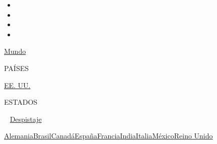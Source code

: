 \begin{itemize}
\item
\item
\item
\item
\end{itemize}

\href{https://www.nytimes3xbfgragh.onion/interactive/2020/world/coronavirus-maps.html}{Mundo}~

PAÍSES

\textbar{}
\href{https://www.nytimes3xbfgragh.onion/es/interactive/2020/espanol/mundo/coronavirus-en-estados-unidos.html}{EE.
UU.}~

ESTADOS

~
\href{https://www.nytimes3xbfgragh.onion/interactive/2020/us/coronavirus-testing.html}{Despistaje}

\href{https://www.nytimes3xbfgragh.onion/interactive/2020/world/europe/germany-coronavirus-cases.html}{Alemania}\href{https://www.nytimes3xbfgragh.onion/interactive/2020/world/americas/brazil-coronavirus-cases.html}{Brasil}\href{https://www.nytimes3xbfgragh.onion/interactive/2020/world/canada/canada-coronavirus-cases.html}{Canadá}\href{https://www.nytimes3xbfgragh.onion/interactive/2020/world/europe/spain-coronavirus-cases.html}{España}\href{https://www.nytimes3xbfgragh.onion/interactive/2020/world/europe/france-coronavirus-cases.html}{Francia}\href{https://www.nytimes3xbfgragh.onion/interactive/2020/world/asia/india-coronavirus-cases.html}{India}\href{https://www.nytimes3xbfgragh.onion/interactive/2020/world/europe/italy-coronavirus-cases.html}{Italia}\href{https://www.nytimes3xbfgragh.onion/es/interactive/2020/espanol/america-latina/coronavirus-en-mexico.html}{México}\href{https://www.nytimes3xbfgragh.onion/interactive/2020/world/europe/united-kingdom-coronavirus-cases.html}{Reino
Unido}

